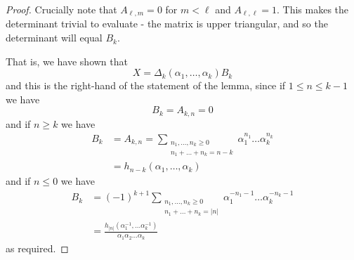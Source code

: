 \documentclass[10pt,a4paper]{amsart}
\begin{document}
\begin{proof}
Crucially note that $A_{\ell,m}=0$ for $m<\ell$ and $A_{\ell,\ell}=1$. This makes the determinant trivial to evaluate - the matrix is upper triangular, and so the determinant will equal $B_k$.

That is, we have shown that
\[
X = \Delta_{k}\left(\alpha_1,\dots,\alpha_{k}\right) B_k
\]
and this is the right-hand of the statement of the lemma, since if $1 \leq n\leq k-1$ we have
\[
B_k = A_{k,n} = 0
\]
and if $n \geq k$ we have
\begin{align*}
B_k &= A_{k,n} = \sum_{\substack{n_1,\dots,n_{k} \geq 0 \\ n_1 + \dots +n_k  = n-k}} \alpha_1^{n_1} \dots \alpha_{k}^{n_k} \\
&= h_{n-k}\left(\alpha_1,\dots,\alpha_k\right)
\end{align*}
and if $n \leq 0$ we have
\begin{align*}
B_k &= (-1)^{k+1} \sum_{\substack{n_1,\dots,n_k \geq 0 \\ n_1 + \dots +n_k = |n|}} \alpha_1^{-n_1-1} \dots \alpha_{k}^{-n_k-1} \\
&= \frac{ h_{|n|}\left(\alpha_1^{-1}, \dots \alpha_k^{-1}\right)}{\alpha_1 \alpha_2 \dots \alpha_k}
\end{align*}
as required.
\end{proof}
\end{document}

